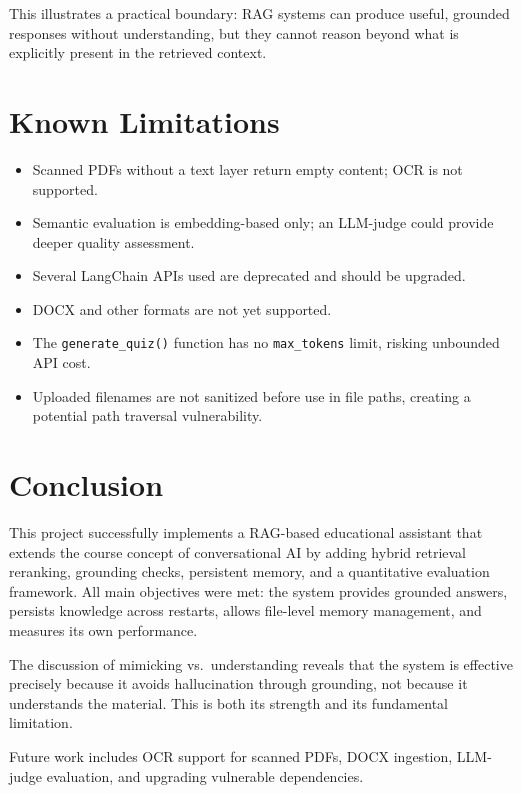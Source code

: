 \documentclass[12pt,a4paper]{article}
\begin{document}
This illustrates a practical boundary: RAG systems can produce useful, grounded
responses without understanding, but they cannot reason beyond what is explicitly
present in the retrieved context.

\section{Known Limitations}

\begin{itemize}[leftmargin=*]
  \item Scanned PDFs without a text layer return empty content; OCR is not supported.
  \item Semantic evaluation is embedding-based only; an LLM-judge could provide
        deeper quality assessment.
  \item Several LangChain APIs used are deprecated and should be upgraded.
  \item DOCX and other formats are not yet supported.
  \item The \texttt{generate\_quiz()} function has no \texttt{max\_tokens} limit,
        risking unbounded API cost.
  \item Uploaded filenames are not sanitized before use in file paths, creating a
        potential path traversal vulnerability.
\end{itemize}

\section{Conclusion}

This project successfully implements a RAG-based educational assistant that extends
the course concept of conversational AI by adding hybrid retrieval reranking, grounding
checks, persistent memory, and a quantitative evaluation framework. All main objectives
were met: the system provides grounded answers, persists knowledge across restarts,
allows file-level memory management, and measures its own performance.

The discussion of mimicking vs.\ understanding reveals that the system is effective
precisely because it avoids hallucination through grounding, not because it understands
the material. This is both its strength and its fundamental limitation.

Future work includes OCR support for scanned PDFs, DOCX ingestion, LLM-judge
evaluation, and upgrading vulnerable dependencies.
\end{document}
